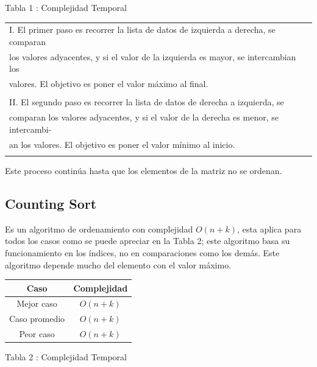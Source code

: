 \documentclass[https://www.overleaf.com/project/63761df255a8a9f4a15c3579
	letterpaper, %
	10pt, %
]{CSUniSchoolLabReport}
\begin{document}
 \begin{center}
    Tabla 1 : Complejidad Temporal
 \end{center}

\begin{tabular}{lr}
    I. El primer paso es recorrer la lista de datos de izquierda a derecha, se comparan \\
    los valores adyacentes, y si el valor de la izquierda es mayor, se intercambian los \\
    valores. El objetivo es poner el valor máximo al final.\\\\

    II. El segundo paso es recorrer la lista de datos de derecha a izquierda, se \\
    comparan los valores adyacentes, y si el valor de la derecha es menor, se intercambi-\\
    an los valores. El objetivo es poner el valor mínimo al inicio.\\\\
\end{tabular}

Este proceso continúa hasta que los elementos de la matriz no se ordenan.\\


\subsection{Counting Sort}

Es un algoritmo de ordenamiento con complejidad  \(O(n + k)\), esta aplica para todos los casos como se puede apreciar en la Tabla 2; este algoritmo basa su funcionamiento en los índices, no en comparaciones como los demás. Este algoritmo depende mucho del elemento con el valor máximo. \\


\begin{center}
    \begin{tabular}{| c | c |}
        \hline
            Caso & Complejidad \\ 
        \hline
            Mejor caso & \(O(n + k)\) \\
            Caso promedio & \(O(n + k)\) \\
            Peor caso & \(O(n + k)\) \\ 
        \hline
    \end{tabular}
\end{center}

 \begin{center}
    Tabla 2 : Complejidad Temporal
 \end{center}
\end{document}
